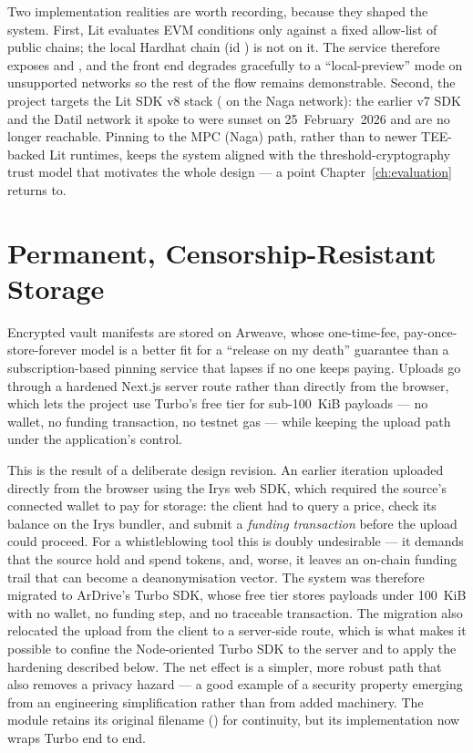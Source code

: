Two implementation realities are worth recording, because they shaped the system.
First, Lit evaluates EVM conditions only against a fixed allow-list of public
chains; the local Hardhat chain (id ) is not on it. The service
therefore exposes  and , and the
front end degrades gracefully to a ``local-preview'' mode on unsupported networks
so the rest of the flow remains demonstrable. Second, the project targets the Lit
SDK v8 stack ( on the Naga network): the earlier v7
SDK and the Datil network it spoke to were sunset on 25~February~2026 and are no
longer reachable. Pinning to the MPC (Naga) path, rather than to newer
TEE-backed Lit runtimes, keeps the system aligned with the threshold-cryptography
trust model that motivates the whole design --- a point Chapter~\ref{ch:evaluation}
returns to.

\section{Permanent, Censorship-Resistant Storage}
\label{sec:impl-storage}

Encrypted vault manifests are stored on Arweave, whose one-time-fee,
pay-once-store-forever model is a better fit for a ``release on my death''
guarantee than a subscription-based pinning service that lapses if no one keeps
paying. Uploads go through a hardened Next.js server route rather than directly
from the browser, which lets the project use Turbo's free tier for sub-100~KiB
payloads --- no wallet, no funding transaction, no testnet gas --- while keeping the
upload path under the application's control.

This is the result of a deliberate design revision. An earlier iteration uploaded
directly from the browser using the Irys web SDK, which required the source's
connected wallet to pay for storage: the client had to query a price, check its
balance on the Irys bundler, and submit a \emph{funding transaction} before the
upload could proceed. For a whistleblowing tool this is doubly undesirable --- it
demands that the source hold and spend tokens, and, worse, it leaves an on-chain
funding trail that can become a deanonymisation vector. The system was therefore
migrated to ArDrive's Turbo SDK, whose  free tier stores
payloads under 100~KiB with no wallet, no funding step, and no traceable
transaction. The migration also relocated the upload from the client to a
server-side route, which is what makes it possible to confine the Node-oriented
Turbo SDK to the server and to apply the hardening described below. The net effect
is a simpler, more robust path that also removes a privacy hazard --- a good example
of a security property emerging from an engineering simplification rather than from
added machinery. The module retains its original filename ()
for continuity, but its implementation now wraps Turbo end to end.


